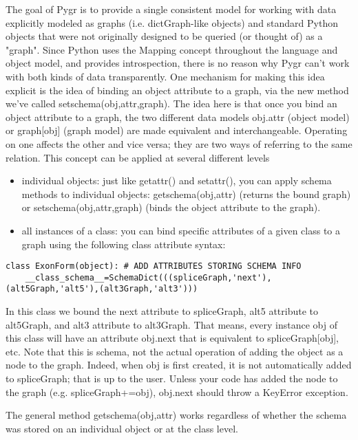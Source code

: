 \documentclass{howto}
\begin{document}
The goal of Pygr is to provide a single consistent model for working with data explicitly modeled as graphs (i.e. dictGraph-like objects) and standard Python objects that were not originally designed to be queried (or thought of) as a "graph".  Since Python uses the Mapping concept throughout the language and object model, and provides introspection, there is no reason why Pygr can't work with both kinds of data transparently.  One mechanism for making this idea explicit is the idea of binding an object attribute to a graph, via the new method we've called setschema(obj,attr,graph).  The idea here is that once you bind an object attribute to a graph, the two different data models obj.attr (object model) or graph[obj] (graph model) are made equivalent and interchangeable.  Operating on one affects the other and vice versa; they are two ways of referring to the same relation.  This concept can be applied at several different levels

\begin{itemize}
\item
individual objects: just like getattr() and setattr(), you can apply schema methods to individual objects: getschema(obj,attr) (returns the bound graph) or setschema(obj,attr,graph) (binds the object attribute to the graph). 

\item
all instances of a class: you can bind specific attributes of a given class to a graph using the following class attribute syntax:

\end{itemize}
\begin{verbatim}
class ExonForm(object): # ADD ATTRIBUTES STORING SCHEMA INFO
    __class_schema__=SchemaDict(((spliceGraph,'next'),(alt5Graph,'alt5'),(alt3Graph,'alt3')))
\end{verbatim}

In this class we bound the next attribute to spliceGraph, alt5 attribute to alt5Graph, and alt3 attribute to alt3Graph.  That means, every instance obj of this class will have an attribute obj.next that is equivalent to spliceGraph[obj], etc.  Note that this is schema, not the actual operation of adding the object as a node to the graph.  Indeed, when obj is first created, it is not automatically added to spliceGraph; that is up to the user.  Unless your code has added the node to the graph (e.g. spliceGraph+=obj), obj.next should throw a KeyError exception.

The general method getschema(obj,attr) works regardless of whether the schema was stored on an individual object or at the class level.
\end{document}
